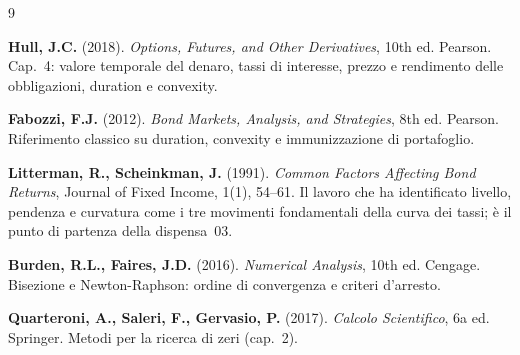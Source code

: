 \documentclass[11pt,a4paper]{article}
\theoremstyle{plain}
\theoremstyle{definition}
\theoremstyle{remark}
\begin{document}
\renewcommand{\refname}{Riferimenti bibliografici}
\begin{thebibliography}{9}

  \textbf{Hull, J.C.} (2018).
  \textit{Options, Futures, and Other Derivatives}, 10th ed. Pearson.
  Cap.~4: valore temporale del denaro, tassi di interesse, prezzo e rendimento delle
  obbligazioni, duration e convexity.

  \textbf{Fabozzi, F.J.} (2012).
  \textit{Bond Markets, Analysis, and Strategies}, 8th ed. Pearson.
  Riferimento classico su duration, convexity e immunizzazione di portafoglio.

  \textbf{Litterman, R., Scheinkman, J.} (1991).
  \textit{Common Factors Affecting Bond Returns}, Journal of Fixed Income, 1(1), 54--61.
  Il lavoro che ha identificato livello, pendenza e curvatura come i tre movimenti
  fondamentali della curva dei tassi; è il punto di partenza della dispensa~03.

  \textbf{Burden, R.L., Faires, J.D.} (2016).
  \textit{Numerical Analysis}, 10th ed. Cengage.
  Bisezione e Newton-Raphson: ordine di convergenza e criteri d'arresto.

  \textbf{Quarteroni, A., Saleri, F., Gervasio, P.} (2017).
  \textit{Calcolo Scientifico}, 6a ed. Springer.
  Metodi per la ricerca di zeri (cap.~2).

\end{thebibliography}
\end{document}

